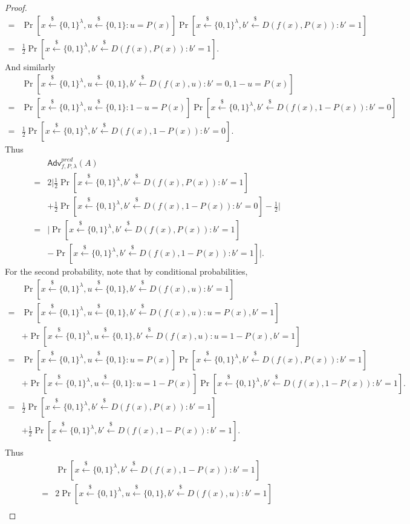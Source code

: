 \documentclass[12pt]{article}
\newcommand{\bits}{\{0,1\}}
\newcommand{\getsr}{\stackrel{\$}{\gets}}
\newcommand{\Adv}{\textsf{Adv}}
\theoremstyle{definition}
\begin{document}
\begin{proof}
$$\begin{aligned}
=& \Pr[x\getsr\bits^\lambda, u\getsr\bits : u = P(x)]\Pr[x\getsr\bits^\lambda, b'\getsr D(f(x),P(x)): b'=1]\\
=&\frac{1}{2}\Pr[x\getsr\bits^\lambda, b'\getsr D(f(x),P(x)): b'=1].
\end{aligned}$$
And similarly
$$\begin{aligned}
&\Pr[x\getsr\bits^\lambda, u\getsr\bits, b'\getsr D(f(x),u): b'=0, 1-u = P(x)] \\
=& \Pr[x\getsr\bits^\lambda, u\getsr\bits: 1-u=P(x)] \Pr[x\getsr\bits^\lambda, b'\getsr D(f(x),1-P(x)): b'=0]\\
=&\frac{1}{2}\Pr[x\getsr\bits^\lambda, b'\getsr D(f(x),1-P(x)): b'=0].
\end{aligned}$$
Thus
$$\begin{aligned}
&\Adv_{f,P,\lambda}^{pred}(A) \\
=& 2\bigg| \frac{1}{2}\Pr[x\getsr\bits^\lambda, b'\getsr D(f(x),P(x)): b'=1] \\
&+ \frac{1}{2}\Pr[x\getsr\bits^\lambda, b'\getsr D(f(x),1-P(x)): b'=0] - \frac{1}{2} \bigg|\\
=& \bigg| \Pr[x\getsr\bits^\lambda, b'\getsr D(f(x),P(x)): b'=1] \\
&- \Pr[x\getsr\bits^\lambda, b'\getsr D(f(x),1-P(x)): b'=1] \bigg|.
\end{aligned}$$
For the second probability, note that by conditional probabilities,
$$\begin{aligned}
& \Pr[x\getsr\bits^\lambda, u\getsr\bits, b'\getsr D(f(x),u): b'=1] \\
=&\Pr[x\getsr\bits^\lambda, u\getsr\bits, b'\getsr D(f(x),u): u=P(x), b'=1] \\
&+\Pr[x\getsr\bits^\lambda, u\getsr\bits, b'\getsr D(f(x),u): u=1-P(x), b'=1] \\
=&\Pr[x\getsr\bits^\lambda, u\getsr\bits: u=P(x)] \Pr[x\getsr\bits^\lambda, b'\getsr D(f(x),P(x)): b'=1] \\
&+\Pr[x\getsr\bits^\lambda, u\getsr\bits: u=1-P(x)] \Pr[x\getsr\bits^\lambda, b'\getsr D(f(x),1-P(x)): b'=1]. \\
=&\frac{1}{2}\Pr[x\getsr\bits^\lambda, b'\getsr D(f(x),P(x)): b'=1] \\
&+\frac{1}{2}\Pr[x\getsr\bits^\lambda, b'\getsr D(f(x),1-P(x)): b'=1]. \\
\end{aligned}$$
Thus
$$\begin{aligned}
&\Pr[x\getsr\bits^\lambda, b'\getsr D(f(x),1-P(x)): b'=1]\\
=&2\Pr[x\getsr\bits^\lambda, u\getsr\bits, b'\getsr D(f(x),u): b'=1]\\

\end{aligned}$$
\end{proof}
\end{document}

